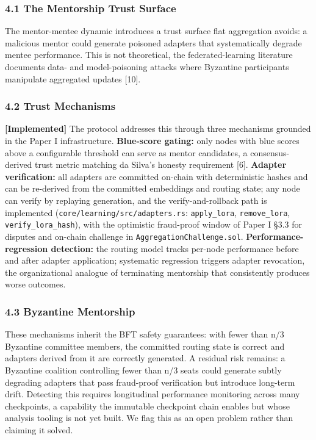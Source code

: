 \subsubsection{4.1 The Mentorship Trust
Surface}\label{the-mentorship-trust-surface}

The mentor-mentee dynamic introduces a trust surface flat aggregation
avoids: a malicious mentor could generate poisoned adapters that
systematically degrade mentee performance. This is not theoretical, the
federated-learning literature documents data- and model-poisoning
attacks where Byzantine participants manipulate aggregated updates
{[}10{]}.

\subsubsection{4.2 Trust Mechanisms}\label{trust-mechanisms}

\textbf{{[}Implemented{]}} The protocol addresses this through three
mechanisms grounded in the Paper I infrastructure. \textbf{Blue-score
gating:} only nodes with blue scores above a configurable threshold can
serve as mentor candidates, a consensus-derived trust metric matching da
Silva's honesty requirement {[}6{]}. \textbf{Adapter verification:} all
adapters are committed on-chain with deterministic hashes and can be
re-derived from the committed embeddings and routing state; any node can
verify by replaying generation, and the verify-and-rollback path is
implemented (\texttt{core/learning/src/adapters.rs}:
\texttt{apply\_lora}, \texttt{remove\_lora},
\texttt{verify\_lora\_hash}), with the optimistic fraud-proof window of
Paper I §3.3 for disputes and on-chain challenge in
\texttt{AggregationChallenge.sol}. \textbf{Performance-regression
detection:} the routing model tracks per-node performance before and
after adapter application; systematic regression triggers adapter
revocation, the organizational analogue of terminating mentorship that
consistently produces worse outcomes.

\subsubsection{4.3 Byzantine Mentorship}\label{byzantine-mentorship}

These mechanisms inherit the BFT safety guarantees: with fewer than n/3
Byzantine committee members, the committed routing state is correct and
adapters derived from it are correctly generated. A residual risk
remains: a Byzantine coalition controlling fewer than n/3 seats could
generate subtly degrading adapters that pass fraud-proof verification
but introduce long-term drift. Detecting this requires longitudinal
performance monitoring across many checkpoints, a capability the
immutable checkpoint chain enables but whose analysis tooling is not yet
built. We flag this as an open problem rather than claiming it solved.

